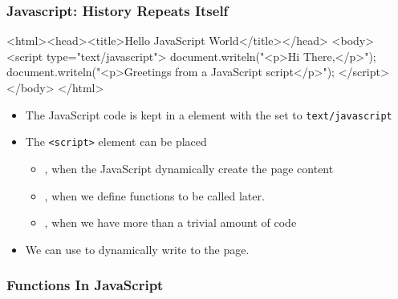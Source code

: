 \documentclass[dvipsnames,handout]{beamer}
\begin{document}
\begin{frame}[fragile=singleslide]
  \frametitle{Javascript: History Repeats Itself}
  
  \begin{small}
\begin{semiverbatim}\color{gray}
<html><head><title>Hello JavaScript World</title></head>
<body>
 {\color{black}<script type="text/javascript">
  document.writeln("<p>Hi There,</p>");
  document.writeln("<p>Greetings from a JavaScript script</p>");   
 </script>} 
</body>
</html>
\end{semiverbatim}
  \end{small}

  \begin{itemize}
  \item The JavaScript code is kept in a 
    element with the  set to
    \texttt{text/javascript}
  \item The \texttt{<script>} element can be placed
    \begin{itemize}
    \item {}, when the JavaScript
      dynamically create the page content
    \item {}, when we define functions
      to be called later.
    \item {}, when we have more than a trivial amount
      of code
    \end{itemize}
  \item We can use  to dynamically
    write to the page.
  \end{itemize}
\end{frame}


\begin{frame}[fragile=singleslide] 
\frametitle{Functions In JavaScript}

\begin{footnotesize}
\end{footnotesize}
\end{frame}
\end{document}
